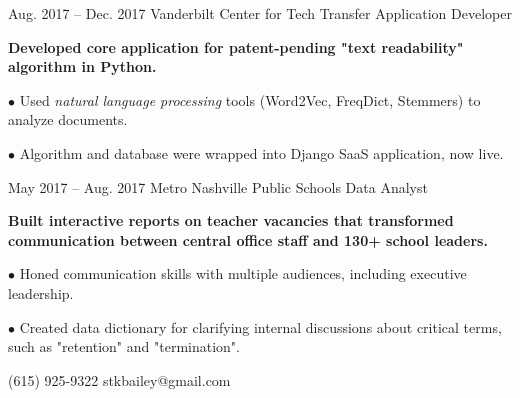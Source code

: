 \documentclass{tccv}
\begin{document}
\begin{eventlist}
\begin{factlist}
    
\end{factlist}

\bigskip

\item{Aug. 2017 -- Dec. 2017}
     {Vanderbilt Center for Tech Transfer}
     {Application Developer}  
     
    \textbf{Developed core application for patent-pending "text readability" algorithm in Python.} 
    \newline

\begin{factlist}
    \item{$\bullet$}
         {Used \textit{natural language processing} tools (Word2Vec, FreqDict, Stemmers) to analyze documents.}
         
    \item{$\bullet$}
         {Algorithm and database were wrapped into Django SaaS application, now live.}
\end{factlist}

\bigskip

\item{May 2017 -- Aug. 2017}
     {Metro Nashville Public Schools}
     {Data Analyst}

    \textbf{Built interactive reports on teacher vacancies that transformed communication between central office staff and 130+ school leaders.} \href{https://app.powerbi.com/view?r=eyJrIjoiZWVhMmIxMjUtOGM1Yi00MzQ4LWE4M2UtMzVlODA4N2NkNTVmIiwidCI6ImM2ODI4MjU3LTY0MTAtNDA3ZS1iNTU3LWI1ZGM3MjExZGU1NSIsImMiOjN9}{\color{blue}\Mundus}
    \newline

\begin{factlist}
    \item{$\bullet$}
        {Honed communication skills with multiple audiences, including executive leadership.}
         
    \item{$\bullet$}
        {Created data dictionary for clarifying internal discussions about critical terms, such as "retention" and "termination".}
\end{factlist}



\end{eventlist}



    {(615) 925-9322}
    {stkbailey@gmail.com}
\end{document}
